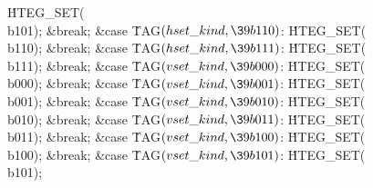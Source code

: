 \.{HTEG\_SET}(\\{b101});\5
\&{break};\6
\4\&{case} \.{TAG}${}(\index{hset kind+\\{hset\_kind}}\\{hset\_kind},\39\\{b110}){}$:\5
\.{HTEG\_SET}(\\{b110});\5
\&{break};\6
\4\&{case} \.{TAG}${}(\index{hset kind+\\{hset\_kind}}\\{hset\_kind},\39\\{b111}){}$:\5
\.{HTEG\_SET}(\\{b111});\5
\&{break};\7
\4\&{case} \.{TAG}${}(\index{vset kind+\\{vset\_kind}}\\{vset\_kind},\39\\{b000}){}$:\5
\.{HTEG\_SET}(\\{b000});\5
\&{break};\6
\4\&{case} \.{TAG}${}(\index{vset kind+\\{vset\_kind}}\\{vset\_kind},\39\\{b001}){}$:\5
\.{HTEG\_SET}(\\{b001});\5
\&{break};\6
\4\&{case} \.{TAG}${}(\index{vset kind+\\{vset\_kind}}\\{vset\_kind},\39\\{b010}){}$:\5
\.{HTEG\_SET}(\\{b010});\5
\&{break};\6
\4\&{case} \.{TAG}${}(\index{vset kind+\\{vset\_kind}}\\{vset\_kind},\39\\{b011}){}$:\5
\.{HTEG\_SET}(\\{b011});\5
\&{break};\6
\4\&{case} \.{TAG}${}(\index{vset kind+\\{vset\_kind}}\\{vset\_kind},\39\\{b100}){}$:\5
\.{HTEG\_SET}(\\{b100});\5
\&{break};\6
\4\&{case} \.{TAG}${}(\index{vset kind+\\{vset\_kind}}\\{vset\_kind},\39\\{b101}){}$:\5
\.{HTEG\_SET}(\\{b101});\5
